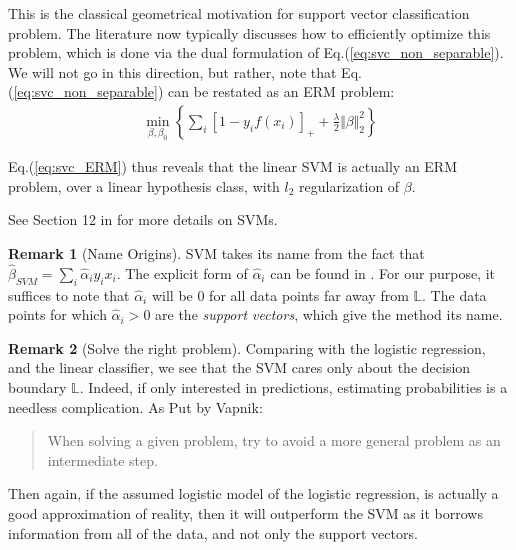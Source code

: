 \documentclass[12pt,a4paper]{article}
\theoremstyle{plain}
\theoremstyle{definition}
\newtheorem{remark}{Remark}
\newcommand{\norm}[1]{\Vert #1 \Vert}
\newcommand{\hyp}{f}
\newcommand{\plane}{\mathbb{L}}
\newcommand{\positive}[1]{\left[ #1 \right]_+}
\begin{document}
This is the classical geometrical motivation for support vector classification problem.
The literature now typically discusses how to efficiently optimize this problem, which is done via the dual formulation of Eq.(\ref{eq:svc_non_separable}).
We will not go in this direction, but rather, note that Eq.(\ref{eq:svc_non_separable}) can be restated as an ERM problem:
\begin{align}
\label{eq:svc_ERM}
	\min_{\beta,\beta_0} \left\{
		\sum_i \positive{1-y_i \hyp(x_i)} +\frac{\lambda}{2} \norm{\beta}_2^2
	\right\}
\end{align}

Eq.(\ref{eq:svc_ERM}) thus reveals that the linear SVM is actually an ERM problem, over a linear hypothesis class, with $l_2$ regularization of $\beta$.

See Section 12 in \cite{hastie_elements_2003} for more details on SVMs.


\begin{remark}[Name Origins]
SVM takes its name from the fact that $\hat{\beta}_{SVM}=\sum_i \hat{\alpha}_i y_i x_i$.
The explicit form of $\hat{\alpha}_i$ can be found in \citep[Section 12.2.1]{hastie_elements_2003}.
For our purpose, it suffices to note that $\hat{\alpha}_i$ will be $0$ for all data points far away from $\plane$.
The data points for which $\hat{\alpha}_i>0$ are the \emph{support vectors}, which give the method its name.
\end{remark}





\begin{remark}[Solve the right problem]
Comparing with the logistic regression, and the linear classifier, we see that the SVM cares only about the decision boundary $\plane$. Indeed, if only interested in predictions, estimating probabilities is a needless complication. As Put by Vapnik: 
\begin{quote}
When solving a given problem, try to avoid a more general problem as an intermediate
step.
\end{quote}
Then again, if the assumed logistic model of the logistic regression, is actually a good approximation of reality, then it will outperform the SVM as it borrows information from all of the data, and not only the support vectors. 
\end{remark}
\end{document}
